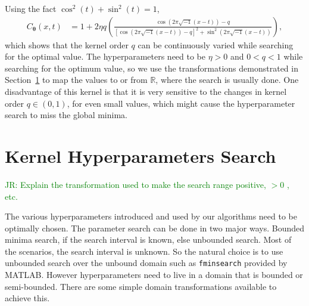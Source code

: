 \documentclass{svjour3}                     %
\newcommand{\bm}[1]{\boldsymbol{#1}}
\newcommand{\reals}{\mathbb{R}}
\newcommand{\vtheta}{{\bm{\theta}}}
\newcommand{\code}[1]{\texttt{#1}}
\newcommand{\JRNote}[1]{{\textcolor{green}{JR: #1}}}
\begin{document}
Using the fact $\cos^2(t) + \sin^2(t) = 1$,
\begin{align*}
C_\vtheta(x, t) &= 
1 + 2 \eta q
\left(
\frac{ \cos({2 \pi\sqrt{-1} (x-t) }) - q }
{ \left[\cos({ 2 \pi\sqrt{-1} (x-t)})-q\right]^2 + \sin^2({ 2 \pi\sqrt{-1} (x-t)}) }
\right),
\end{align*}
which shows that the kernel order $q$ can be continuously varied while searching for the optimal value. 
The hyperparameters need to be $\eta > 0$ and $ 0 < q < 1$ while searching for the optimum value, so we use the transformations demonstrated in Section~\ref{sec:kernel_param_search} to map the values to or from $\reals$, where the search is usually done.
One disadvantage of this kernel is that it is very sensitive to the changes in kernel order $q \in (0,1)$, for even small values, which might cause the hyperparameter search to miss the global minima.



















\section{Kernel Hyperparameters Search}
\label{sec:kernel_param_search}

\JRNote{Explain the transformation used to make the search range positive, $> 0$ , etc.}

The various hyperparameters introduced and used by our algorithms need to be optimally chosen. %
The parameter search can be done in two major ways. 
Bounded minima search, if the search interval is known, else unbounded search.  Most of the scenarios, the search interval is unknown. So the natural choice is to use unbounded search over the unbound domain such as \code{fminsearch} provided by MATLAB.
However hyperparameters need to live in a domain that is bounded or semi-bounded. 
There are some simple domain transformations available to achieve this.
\end{document}
